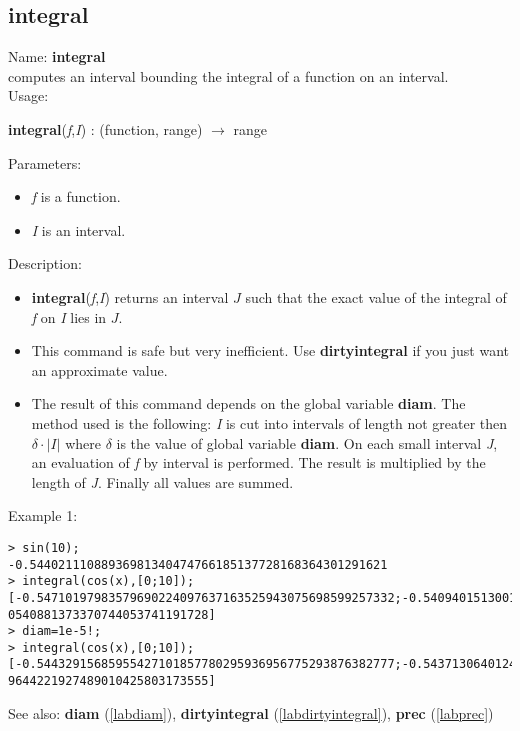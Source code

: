 \subsection{integral}
\label{labintegral}
\noindent Name: \textbf{integral}\\
computes an interval bounding the integral of a function on an interval.\\
\noindent Usage: 
\begin{center}
\textbf{integral}(\emph{f},\emph{I}) : (\textsf{function}, \textsf{range}) $\rightarrow$ \textsf{range}\\
\end{center}
Parameters: 
\begin{itemize}
\item \emph{f} is a function.
\item \emph{I} is an interval.
\end{itemize}
\noindent Description: \begin{itemize}

\item \textbf{integral}(\emph{f},\emph{I}) returns an interval $J$ such that the exact value of 
   the integral of \emph{f} on \emph{I} lies in $J$.

\item This command is safe but very inefficient. Use \textbf{dirtyintegral} if you just want
   an approximate value.

\item The result of this command depends on the global variable \textbf{diam}.
   The method used is the following: \emph{I} is cut into intervals of length not 
   greater then $\delta \cdot |I|$ where $\delta$ is the value
   of global variable \textbf{diam}.
   On each small interval \emph{J}, an evaluation of \emph{f} by interval is
   performed. The result is multiplied by the length of \emph{J}. Finally all values 
   are summed.
\end{itemize}
\noindent Example 1: 
\begin{center}\begin{minipage}{15cm}\begin{Verbatim}[frame=single]
> sin(10);
-0.54402111088936981340474766185137728168364301291621
> integral(cos(x),[0;10]);
[-0.54710197983579690224097637163525943075698599257332;-0.5409401513001318384815
0540881373370744053741191728]
> diam=1e-5!;
> integral(cos(x),[0;10]);
[-0.54432915685955427101857780295936956775293876382777;-0.5437130640124996950803
9644221927489010425803173555]
\end{Verbatim}
\end{minipage}\end{center}
See also: \textbf{diam} (\ref{labdiam}), \textbf{dirtyintegral} (\ref{labdirtyintegral}), \textbf{prec} (\ref{labprec})
